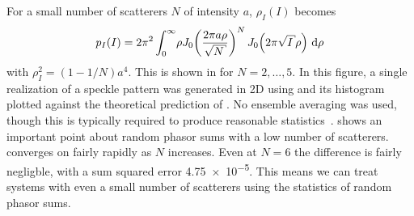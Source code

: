 For a small number of scatterers $N$ of intensity $a$, $\rho_I(I)$ becomes
\begin{equation}
p_I(I) = 2\pi^2 \int_0^\infty\! \rho J_0\!\left(\frac{2\pi a
\rho}{\sqrt{N}}\right)^N J_0\!\left(2\pi\sqrt{I}\rho\right)\md\rho
\label{eqn:smallscatteqn}
\end{equation}
with $\rho_I^2=(1-1/N)a^4$.  This is shown in  for
$N=2,\ldots,5$.  In this figure, a single realization of a speckle pattern was generated in 2D
using  and its histogram plotted against the
theoretical prediction of .  No ensemble
averaging was used, though this is typically required to produce reasonable 
statistics~\cite{goodman2007speckle}.
 shows an important point about random phasor sums
with a low number of scatterers.   converges on
 fairly rapidly as $N$ increases.  Even at $N=6$ the
difference is fairly negligble, with a sum squared error \num{4.75e-5}.
This means we can treat systems with even a small number of scatterers
using the statistics of random phasor sums.
